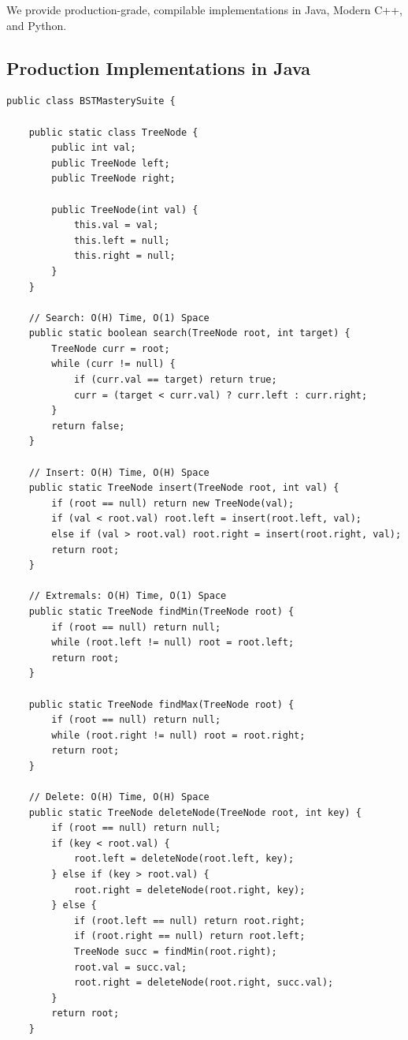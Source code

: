\documentclass[10pt,journal,compsoc,onecolumn]{IEEEtran}
\begin{document}
We provide production-grade, compilable implementations in Java, Modern C++, and Python.

\subsection{Production Implementations in Java}

\begin{verbatim}
public class BSTMasterySuite {

    public static class TreeNode {
        public int val;
        public TreeNode left;
        public TreeNode right;

        public TreeNode(int val) {
            this.val = val;
            this.left = null;
            this.right = null;
        }
    }

    // Search: O(H) Time, O(1) Space
    public static boolean search(TreeNode root, int target) {
        TreeNode curr = root;
        while (curr != null) {
            if (curr.val == target) return true;
            curr = (target < curr.val) ? curr.left : curr.right;
        }
        return false;
    }

    // Insert: O(H) Time, O(H) Space
    public static TreeNode insert(TreeNode root, int val) {
        if (root == null) return new TreeNode(val);
        if (val < root.val) root.left = insert(root.left, val);
        else if (val > root.val) root.right = insert(root.right, val);
        return root;
    }

    // Extremals: O(H) Time, O(1) Space
    public static TreeNode findMin(TreeNode root) {
        if (root == null) return null;
        while (root.left != null) root = root.left;
        return root;
    }

    public static TreeNode findMax(TreeNode root) {
        if (root == null) return null;
        while (root.right != null) root = root.right;
        return root;
    }

    // Delete: O(H) Time, O(H) Space
    public static TreeNode deleteNode(TreeNode root, int key) {
        if (root == null) return null;
        if (key < root.val) {
            root.left = deleteNode(root.left, key);
        } else if (key > root.val) {
            root.right = deleteNode(root.right, key);
        } else {
            if (root.left == null) return root.right;
            if (root.right == null) return root.left;
            TreeNode succ = findMin(root.right);
            root.val = succ.val;
            root.right = deleteNode(root.right, succ.val);
        }
        return root;
    }


\end{verbatim}
\end{document}
